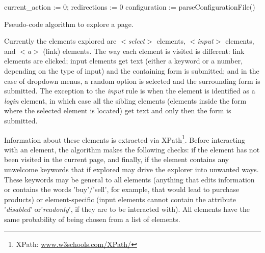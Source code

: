 \documentclass[conference]{IEEEtran}
\begin{document}
\begin{algorithm}
  
  current\_action := 0; redirections := 0\;
  configuration := parseConfigurationFile()\;
  

\caption{Pseudo-code algorithm to explore a page.}\label{alg:seeker}
\end{algorithm}

Currently the elements explored are \textit{$<$select$>$} elements, \textit{$<$input$>$} elements, and \textit{$<$a$>$} (link) elements. The way each element is visited is different: link elements are clicked; input elements get text (either a keyword or a number, depending on the type of input) and the containing form is submitted; and in the case of dropdown menus, a random option is selected and the surrounding form is submitted. The exception to the \textit{input} rule is when the element is identified as a \textit{login} element, in which case all the sibling elements (elements inside the form where the selected element is located) get text and only then the form is submitted.

Information about these elements is extracted via XPath\footnote{XPath: \url{www.w3schools.com/XPath/}}. Before interacting with an element, the algorithm makes the following checks: if the element has not been visited in the current page, and finally, if the element contains any unwelcome keywords that if explored may drive the explorer into unwanted ways. These keywords may be general to all elements (anything that edits information or contains the words 'buy'/'sell', for example, that would lead to purchase products) or element-specific (input elements cannot contain the attribute '\textit{disabled}' or'\textit{readonly}', if they are to be interacted with). All elements have the same probability of being chosen from a list of elements.
\end{document}
